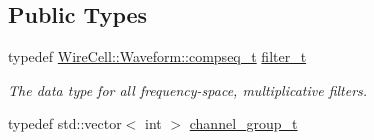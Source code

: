 \subsection*{Public Types}
\begin{DoxyCompactItemize}
\item 
typedef \hyperlink{namespace_wire_cell_1_1_waveform_a7e4a8d371f774438bb360e7d1dcb583a}{Wire\+Cell\+::\+Waveform\+::compseq\+\_\+t} \hyperlink{class_wire_cell_1_1_i_channel_noise_database_a0acbae29743542eb1c652f7a56e692f5}{filter\+\_\+t}
\begin{DoxyCompactList}\small\item\em The data type for all frequency-\/space, multiplicative filters. \end{DoxyCompactList}\item 
typedef std\+::vector$<$ int $>$ \hyperlink{class_wire_cell_1_1_i_channel_noise_database_a7fedd6ab67ba4e7eeb8cf182cc9dc6b1}{channel\+\_\+group\+\_\+t}
\end{DoxyCompactItemize}
